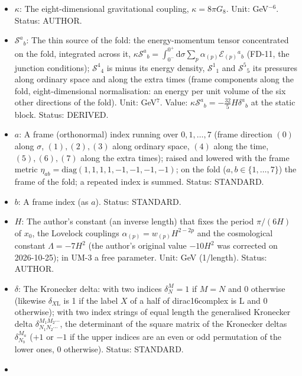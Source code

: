 \documentclass[
  10pt,
]{article}
\providecommand{\tightlist}{%
  \setlength{\itemsep}{0pt}\setlength{\parskip}{0pt}}
\begin{document}
\begin{itemize}
\tightlist
\item
  \(\kappa\): The eight-dimensional gravitational coupling,
  \(\kappa = 8\pi G_8\). Unit: GeV\(^{-6}\). Status: AUTHOR.
\item
  \(\mathcal{S}^a{}_b\): The thin source of the fold: the
  energy-momentum tensor concentrated on the fold, integrated across it,
  \(\kappa\mathcal{S}^a{}_b = \int_{0^-}^{0^+}\mathrm{d}\sigma\sum_p\alpha_{(p)}\mathcal{E}_{(p)}{}^a{}_b\)
  (FD-11, the junction conditions); \(\mathcal{S}^4{}_4\) is minus its
  energy density, \(\mathcal{S}^1{}_1\) and \(\mathcal{S}^5{}_5\) its
  pressures along ordinary space and along the extra times (frame
  components along the fold, eight-dimensional normalisation: an energy
  per unit volume of the six other directions of the fold). Unit:
  GeV\(^7\). Value:
  \(\kappa\mathcal{S}^a{}_b = -\frac{32}{5}H\delta^a{}_b\) at the static
  block. Status: DERIVED.
\item
  \(a\): A frame (orthonormal) index running over \(0, 1, \dots, 7\)
  (frame direction \((0)\) along \(\sigma\), \((1), (2), (3)\) along
  ordinary space, \((4)\) along the time, \((5), (6), (7)\) along the
  extra times); raised and lowered with the frame metric
  \(\eta_{ab} = \mathrm{diag}(1, 1, 1, 1, -1, -1, -1, -1)\); on the fold
  (\(a, b \in \{1, \dots, 7\}\)) the frame of the fold; a repeated index
  is summed. Status: STANDARD.
\item
  \(b\): A frame index (as \(a\)). Status: STANDARD.
\item
  \(H\): The author's constant (an inverse length) that fixes the period
  \(\pi/(6H)\) of \(x_0\), the Lovelock couplings
  \(\alpha_{(p)} = w_{(p)}H^{2-2p}\) and the cosmological constant
  \(\Lambda = -7H^2\) (the author's original value \(-10H^2\) was
  corrected on 2026-10-25); in UM-3 a free parameter. Unit: GeV
  (1/length). Status: AUTHOR.
\item
  \(\delta\): The Kronecker delta: with two indices \(\delta^M_N = 1\)
  if \(M = N\) and 0 otherwise (likewise \(\delta_{X\mathrm{L}}\) is 1
  if the label \(X\) of a half of dirac16complex is L and 0 otherwise);
  with two index strings of equal length the generalised Kronecker delta
  \(\delta^{M_1M_2\cdots}_{N_1N_2\cdots}\), the determinant of the
  square matrix of the Kronecker deltas \(\delta^{M_a}_{N_b}\) (\(+1\)
  or \(-1\) if the upper indices are an even or odd permutation of the
  lower ones, 0 otherwise). Status: STANDARD.
\item

\end{itemize}
\end{document}
